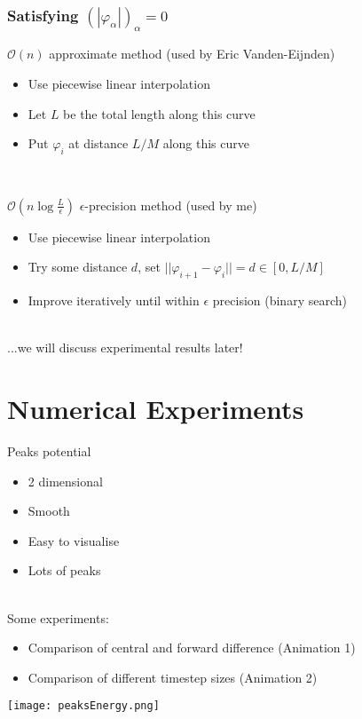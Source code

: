 \documentclass{beamer}
\renewcommand{\phi}{\varphi}
\renewcommand{\(}{\left(}
\renewcommand{\)}{\right)}
\begin{document}
\begin{frame}
\frametitle{Satisfying $(|\phi_\alpha|)_\alpha=0$}
\begin{block}{$\mathcal{O}(n)$ approximate method (used by Eric Vanden-Eijnden)}
\begin{itemize}
\item Use piecewise linear interpolation
\item Let $L$ be the total length along this curve
\item Put $\phi_i$ at distance $L/M$ along this curve
\end{itemize}
\end{block}
~\\
\begin{block}{$\mathcal{O}(n\log \frac{L}{\epsilon})$ $\epsilon$-precision method (used by me)}
\begin{itemize}
\item Use piecewise linear interpolation
\item Try some distance $d$, set $||\phi_{i+1}-\phi_i|| = d \in [0, L/M]$
\item Improve iteratively until within $\epsilon$ precision (binary search)
\end{itemize}
\end{block}
~\\
...we will discuss experimental results later!
\end{frame}


\section{Numerical Experiments}
\begin{frame}
Peaks potential
\begin{itemize}
\item 2 dimensional
\item Smooth
\item Easy to visualise
\item Lots of peaks
\end{itemize}
~\\
Some experiments:
\begin{itemize}
\item Comparison of central and forward difference (Animation 1)
\item Comparison of different timestep sizes (Animation 2)
\end{itemize}

\begin{center}
\texttt{[image: peaksEnergy.png]}
\end{center}

\end{frame}
\end{document}
